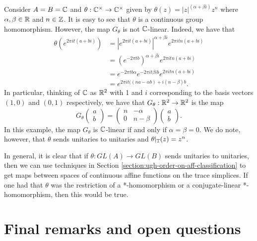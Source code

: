 \documentclass[12pt]{amsart}
\begin{document}
\begin{example}\label{example:non-C-linear}
Consider $A = B = \mathbb{C}$ and $\theta: \mathbb{C}^\times \to \mathbb{C}^\times$ given by $\theta(z) = |z|^{(\alpha + \beta i)}z^n$ where $\alpha,\beta \in \mathbb{R}$ and $n \in \mathbb{Z}$. It is easy to see that $\theta$ is a continuous group homomorphism. However, the map $G_\theta$ is not $\mathbb{C}$-linear. Indeed, we have that
\begin{equation}
\begin{split}
\theta(e^{2\pi i t(a+bi)}) &= |e^{2\pi i t(a + bi)}|^{\alpha + \beta i}e^{2\pi i t n(a + bi)} \\
&= (e^{-2\pi t b})^{\alpha + \beta i}e^{2\pi i t n(a + bi)} \\
&= e^{-2\pi t b\alpha}e^{-2\pi i t\beta i b}e^{2\pi i t n(a + bi)} \\
&= e^{2\pi i t((na - \alpha b) + i(n - \beta)b}.
\end{split}
\end{equation}
In particular, thinking of $\mathbb{C}$ as $\mathbb{R}^2$ with 1 and $i$ corresponding to the basis vectors $(1,0)$ and $(0,1)$ respectively, we have that $G_\theta: \mathbb{R}^2 \to \mathbb{R}^2$ is the map
\begin{equation}
G_\theta\begin{pmatrix}
a \\ b
\end{pmatrix} = \begin{pmatrix}
n & -\alpha \\ 0 & n - \beta
\end{pmatrix}\begin{pmatrix}
a \\ b
\end{pmatrix}.
\end{equation}
In this example, the map $G_\theta$ is $\mathbb{C}$-linear if and only if $\alpha = \beta = 0$. We do note, however, that $\theta$ sends unitaries to unitaries and $\theta|_{\mathbb{T}}(z) = z^n$.
\end{example}

In general, it is clear that if $\theta: GL(A) \to GL(B)$ sends unitaries to unitaries, then we can use techniques in Section \ref{section:ugh-order-on-aff-classification} to get maps between spaces of continuous affine functions on the trace simplices. If one had that $\theta$ was the restriction of a *-homomorphism or a conjugate-linear *-homomorphism, then this would be true. 

\section{Final remarks and open questions}\label{section:ugh-final-remarks}
\end{document}
